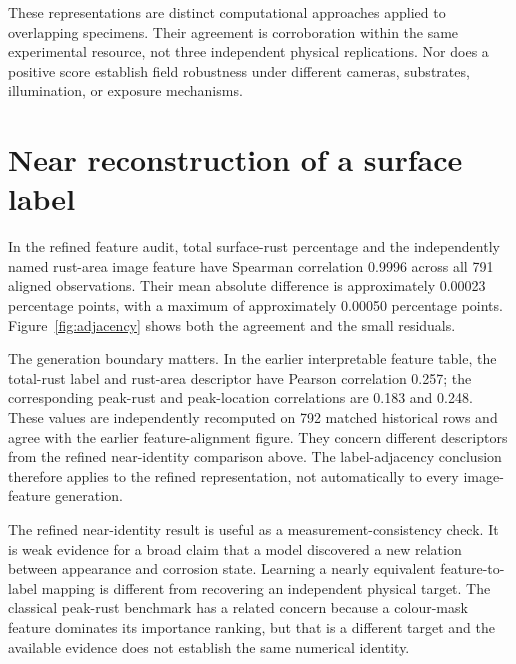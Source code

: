 These representations are distinct computational approaches applied to overlapping specimens. Their agreement is corroboration within the same experimental resource, not three independent physical replications. Nor does a positive score establish field robustness under different cameras, substrates, illumination, or exposure mechanisms.

\section{Near reconstruction of a surface label}\label{sec:adjacency}
In the refined feature audit, total surface-rust percentage and the independently named rust-area image feature have Spearman correlation 0.9996 across all 791 aligned observations. Their mean absolute difference is approximately 0.00023 percentage points, with a maximum of approximately 0.00050 percentage points. Figure~\ref{fig:adjacency} shows both the agreement and the small residuals.


The generation boundary matters. In the earlier interpretable feature table, the total-rust label and rust-area descriptor have Pearson correlation 0.257; the corresponding peak-rust and peak-location correlations are 0.183 and 0.248. These values are independently recomputed on 792 matched historical rows and agree with the earlier feature-alignment figure. They concern different descriptors from the refined near-identity comparison above. The label-adjacency conclusion therefore applies to the refined representation, not automatically to every image-feature generation.

The refined near-identity result is useful as a measurement-consistency check. It is weak evidence for a broad claim that a model discovered a new relation between appearance and corrosion state. Learning a nearly equivalent feature-to-label mapping is different from recovering an independent physical target. The classical peak-rust benchmark has a related concern because a colour-mask feature dominates its importance ranking, but that is a different target and the available evidence does not establish the same numerical identity.

